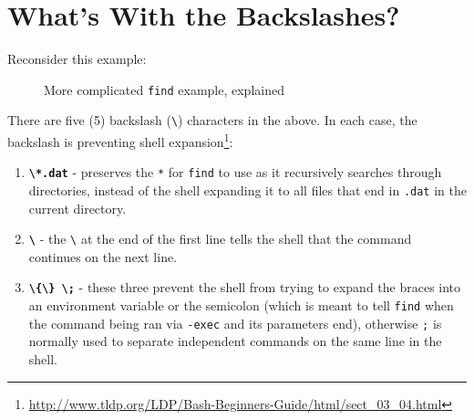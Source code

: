 \documentclass[10pt,american,]{book}
\newenvironment{Shaded}{\begin{snugshade}}{\end{snugshade}}
\newcommand{\KeywordTok}[1]{\textcolor[rgb]{0.13,0.29,0.53}{\textbf{{#1}}}}
\newcommand{\DataTypeTok}[1]{\textcolor[rgb]{0.13,0.29,0.53}{{#1}}}
\newcommand{\NormalTok}[1]{{#1}}
\renewcommand{\href}[2]{#2\footnote{\url{#1}}}
\numberwithin{figure}{chapter}
\DeclareRobustCommand{\drcap}[1]{\begin{figure}[H]\caption{#1}\end{figure}}
\renewcommand{\KeywordTok}[1]{{#1}}
\renewcommand{\DataTypeTok}[1]{{#1}}
\renewcommand{\NormalTok}[1]{{#1}}
\begin{document}
\section*{What's With the
Backslashes?}\label{whats-with-the-backslashes}

Reconsider this example:

\drcap{More complicated \texttt{find} example, explained}

\begin{Shaded}
\end{Shaded}

There are five (5) backslash
(\texttt{\textbackslash{}})
characters in the above. In each case, the backslash is preventing
\href{http://www.tldp.org/LDP/Bash-Beginners-Guide/html/sect_03_04.html}{shell
expansion}:

\begin{enumerate}
\def\labelenumi{\arabic{enumi}.}
\item
  \textbf{\texttt{\textbackslash{}*.dat}} - preserves the
  \texttt{*} for \texttt{find} to use as
  it recursively searches through directories, instead of the shell
  expanding it to all files that end in \texttt{.dat} in the current
  directory.
\item
  \textbf{\texttt{\textbackslash{}}} - the \texttt{\textbackslash{}} at
  the end of the first line tells the shell that the command continues
  on the next line.
\item
  \textbf{\texttt{\textbackslash{}\{\textbackslash{}\}\ \textbackslash{};}}
  - these three prevent the shell from trying to expand the braces into
  an environment variable or the semicolon (which is meant to tell
  \texttt{find} when the command being ran via \texttt{-exec} and its
  parameters end), otherwise
  \texttt{;} is normally used to
  separate independent commands on the same line in the shell.
\end{enumerate}
\end{document}
